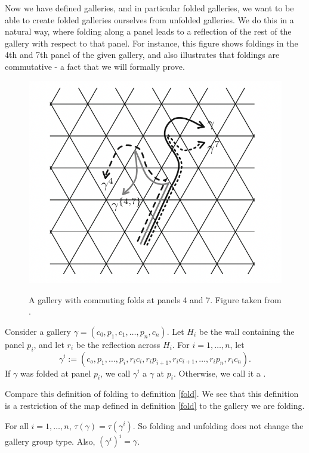 \documentclass[11pt]{article}
\begin{document}
Now we have defined galleries, and in particular folded galleries, we want to be able to create folded galleries ourselves from unfolded galleries. We do this in a natural way, where folding along a panel leads to a reflection of the rest of the gallery with respect to that panel. For instance, this figure shows foldings in the 4th and 7th panel of the given gallery, and also illustrates that foldings are commutative - a fact that we will formally prove.
\begin{figure}[!htbp]
    \begin{center}
    \includegraphics[scale=0.4]{Screenshot 2023-04-18 at 17.30.24.png}\\
    \end{center}
    \caption{A gallery with commuting folds at panels 4 and 7. Figure taken from \cite[p.132]{SHA}.}
\end{figure}

\begin{definition}
    Consider a gallery $\gamma = (c_0,p_1,c_1,\hdots ,p_n,c_n)$. Let $H_i$ be the wall containing the panel $p_i$, and let $r_i$ be the reflection across $H_i$. For $i=1,\hdots ,n$, let
    \[\gamma^i:=(c_o,p_1,\hdots ,p_i,r_ic_i,r_ip_{i+1},r_ic_{i+1},\hdots ,r_ip_n,r_ic_n).\]
    If $\gamma$ was folded at panel $p_i$, we call $\gamma^i$ a $\gamma$ at $p_i$. Otherwise, we call it a .
\end{definition}

Compare this definition of folding to definition \ref{fold}. We see that this definition is a restriction of the map defined in definition \ref{fold} to the gallery we are folding. 
\begin{lemma}
    For all $i=1,\hdots ,n$, $\tau(\gamma)=\tau(\gamma^i)$. So folding and unfolding does not change the gallery group type. Also, $(\gamma^i)^i=\gamma$.
\end{lemma}
\end{document}
